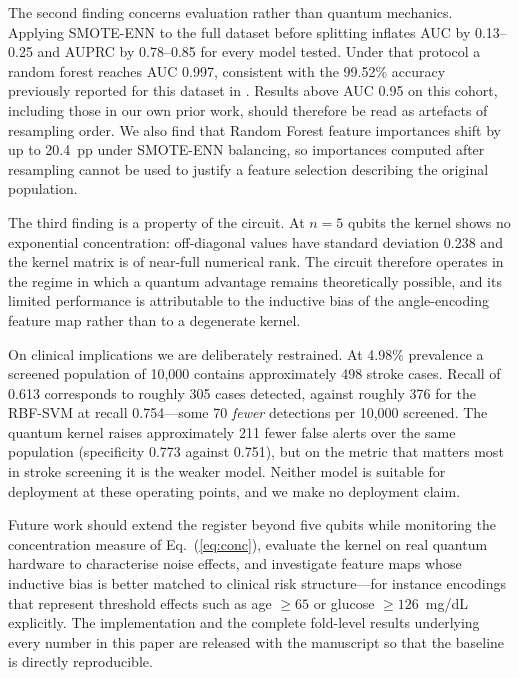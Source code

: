 \documentclass{ws-ijqi}
\begin{document}
The second finding concerns evaluation rather than quantum mechanics. Applying
SMOTE-ENN to the full dataset before splitting inflates AUC by 0.13--0.25 and
AUPRC by 0.78--0.85 for every model tested. Under that protocol a random forest
reaches AUC 0.997, consistent with the 99.52\% accuracy previously reported for
this dataset in . Results above AUC 0.95 on this cohort,
including those in our own prior work, should therefore be read as artefacts of
resampling order. We also find that Random Forest feature importances shift by
up to 20.4~pp under SMOTE-ENN balancing, so importances computed after
resampling cannot be used to justify a feature selection describing the
original population.

The third finding is a property of the circuit. At $n=5$ qubits the kernel
shows no exponential concentration: off-diagonal values have standard deviation
0.238 and the kernel matrix is of near-full numerical rank. The circuit
therefore operates in the regime in which a quantum advantage remains
theoretically possible,\cite{thanasilp2024} and its limited performance is
attributable to the inductive bias of the angle-encoding feature map rather
than to a degenerate kernel.

On clinical implications we are deliberately restrained. At 4.98\% prevalence a
screened population of 10,000 contains approximately 498 stroke cases. Recall
of 0.613 corresponds to roughly 305 cases detected, against roughly 376 for the
RBF-SVM at recall 0.754---some 70 \emph{fewer} detections per 10,000 screened.
The quantum kernel raises approximately 211 fewer false alerts over the same
population (specificity 0.773 against 0.751), but on the metric that matters
most in stroke screening it is the weaker model. Neither model is suitable for
deployment at these operating points, and we make no deployment claim.

Future work should extend the register beyond five qubits while monitoring the
concentration measure of Eq.~(\ref{eq:conc}), evaluate the kernel on real
quantum hardware to characterise noise effects, and investigate feature maps
whose inductive bias is better matched to clinical risk structure---for
instance encodings that represent threshold effects such as age $\geq 65$ or
glucose $\geq 126$~mg/dL explicitly. The implementation and the complete
fold-level results underlying every number in this paper are released with the
manuscript so that the baseline is directly reproducible.

\end{document}
